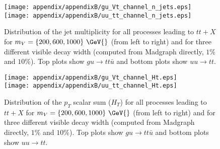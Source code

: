\begin{figure}[!h!tpd]
  \centering
  \texttt{[image: appendix/appendixB/gu\_Vt\_channel\_n\_jets.eps]}\\
  \texttt{[image: appendix/appendixB/uu\_tt\_channel\_n\_jets.eps]}
  \caption{
      Distribution of the jet multiplicity for all processes leading to $tt+X$
      for $m_V = \{200, 600, 1000\}~\GeV{}$ (from left to right) and for three different
      visible decay width (computed from Madgraph directly, $1\%$ and $10\%$). Top plots show $gu \to tt \bar{u}$ and bottom plots show $uu \to tt$.
  }   
  \label{fig:appB:Vmass}
\end{figure}

\begin{figure}[!h!tpd]
  \centering
  \texttt{[image: appendix/appendixB/gu\_Vt\_channel\_Ht.eps]}\\
  \texttt{[image: appendix/appendixB/uu\_tt\_channel\_Ht.eps]}
  \caption{
    Distribution of the $p_T$ scalar sum ($H_T$) for all processes leading to $tt+X$
    for $m_V = \{200, 600, 1000\}~\GeV{}$ (from left to right) and for three different
    visible decay width (computed from Madgraph directly, $1\%$ and $10\%$). Top plots show $gu \to tt \bar{u}$ and bottom plots show $uu \to tt$.
  }   
  \label{fig:appB:HT_stchannel}
\end{figure}

